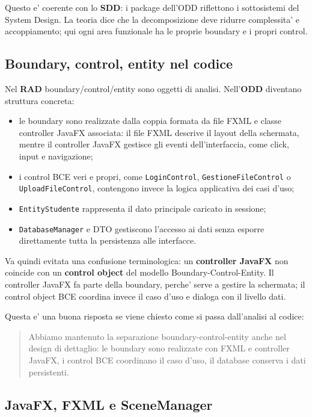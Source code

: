﻿\documentclass[11pt,a4paper]{article}
\newcommand{\doc}[1]{\textbf{#1}}
\newcommand{\term}[1]{\textbf{#1}}
\begin{document}
Questo e' coerente con lo \doc{SDD}: i package dell'ODD riflettono i sottosistemi del
System Design. La teoria dice che la decomposizione deve ridurre complessita' e
accoppiamento; qui ogni area funzionale ha le proprie boundary e i propri control.

\subsection{Boundary, control, entity nel codice}

Nel \doc{RAD} boundary/control/entity sono oggetti di analisi. Nell'\doc{ODD} diventano
struttura concreta:
\begin{itemize}
  \item le boundary sono realizzate dalla coppia formata da file FXML e classe controller
  JavaFX associata: il file FXML descrive il layout della schermata, mentre il controller
  JavaFX gestisce gli eventi dell'interfaccia, come click, input e navigazione;
  \item i control BCE veri e propri, come \texttt{LoginControl},
  \texttt{GestioneFileControl} o \texttt{UploadFileControl}, contengono invece la logica
  applicativa dei casi d'uso;
  \item \texttt{EntityStudente} rappresenta il dato principale caricato in sessione;
  \item \texttt{DatabaseManager} e DTO gestiscono l'accesso ai dati senza esporre
  direttamente tutta la persistenza alle interfacce.
\end{itemize}

Va quindi evitata una confusione terminologica: un \term{controller JavaFX} non coincide
con un \term{control object} del modello Boundary-Control-Entity. Il controller JavaFX fa
parte della boundary, perche' serve a gestire la schermata; il control object BCE coordina
invece il caso d'uso e dialoga con il livello dati.

Questa e' una buona risposta se viene chiesto come si passa dall'analisi al codice:
\begin{quote}
Abbiamo mantenuto la separazione boundary-control-entity anche nel design di dettaglio:
le boundary sono realizzate con FXML e controller JavaFX, i control BCE coordinano il
caso d'uso, il database conserva i dati persistenti.
\end{quote}

\subsection{JavaFX, FXML e SceneManager}
\end{document}
